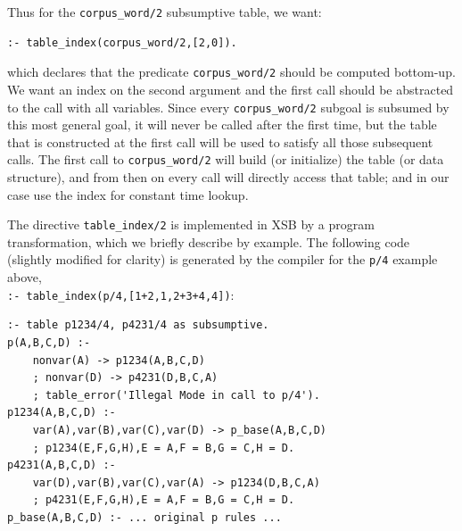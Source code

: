 Thus for the {\tt corpus\_word/2} subsumptive table, we want:

\begin{verbatim}
:- table_index(corpus_word/2,[2,0]).
\end{verbatim}

\noindent which declares that the predicate {\tt corpus\_word/2} should be
computed bottom-up.  We want an index on the second argument and the
first call should be abstracted to the call with all variables.  Since
every {\tt corpus\_word/2} subgoal is subsumed by this most general
goal, it will never be called after the first time, but the table that
is constructed at the first call will be used to satisfy all those
subsequent calls.  The first call to {\tt corpus\_word/2} will build
(or initialize) the table (or data structure), and from then on every
call will directly access that table; and in our case use the index
for constant time lookup.

The directive {\tt table\_index/2} is implemented in XSB by a program
transformation, which we briefly describe by example.  The following
code (slightly modified for clarity) is generated by the compiler for
the {\tt p/4} example above, \\
\verb|:- table_index(p/4,[1+2,1,2+3+4,4])|:


\footnotesize
\begin{verbatim}
:- table p1234/4, p4231/4 as subsumptive.
p(A,B,C,D) :-
    nonvar(A) -> p1234(A,B,C,D)
    ; nonvar(D) -> p4231(D,B,C,A)
    ; table_error('Illegal Mode in call to p/4').
p1234(A,B,C,D) :-
    var(A),var(B),var(C),var(D) -> p_base(A,B,C,D)
    ; p1234(E,F,G,H),E = A,F = B,G = C,H = D.
p4231(A,B,C,D) :-
    var(D),var(B),var(C),var(A) -> p1234(D,B,C,A)
    ; p4231(E,F,G,H),E = A,F = B,G = C,H = D.
p_base(A,B,C,D) :- ... original p rules ...
\end{verbatim}
\normalsize

